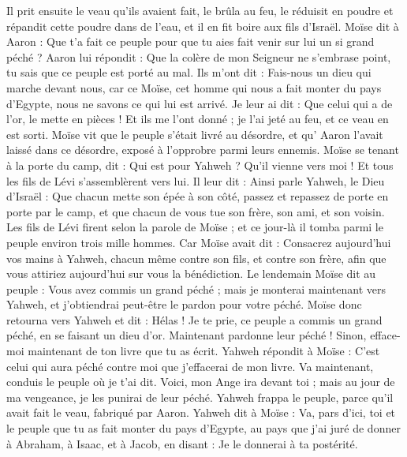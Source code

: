 \begin{multicols}{2}
Il prit ensuite le veau qu'ils avaient fait, le brûla au feu, le réduisit en poudre et répandit cette poudre dans de l'eau, et il en fit boire aux fils d'Israël.
Moïse dit à Aaron : Que t'a fait ce peuple pour que tu aies fait venir sur lui un si grand péché ?
Aaron lui répondit : Que la colère de mon Seigneur ne s'embrase point, tu sais que ce peuple est porté au mal.
Ils m'ont dit : Fais-nous un dieu qui marche devant nous, car ce Moïse, cet homme qui nous a fait monter du pays d'Egypte, nous ne savons ce qui lui est arrivé.
Je leur ai dit : Que celui qui a de l'or, le mette en pièces ! Et ils me l'ont donné ; je l'ai jeté au feu, et ce veau en est sorti.
Moïse vit que le peuple s’était livré au désordre, et qu’ Aaron l'avait laissé dans ce désordre, exposé à l’opprobre parmi leurs ennemis.
Moïse se tenant à la porte du camp, dit : Qui est pour Yahweh ? Qu'il vienne vers moi ! Et tous les fils de Lévi s'assemblèrent vers lui.
Il leur dit : Ainsi parle Yahweh, le Dieu d'Israël : Que chacun mette son épée à son côté, passez et repassez de porte en porte par le camp, et que chacun de vous tue son frère, son ami, et son voisin.
Les fils de Lévi firent selon la parole de Moïse ; et ce jour-là il tomba parmi le peuple environ trois mille hommes.
Car Moïse avait dit : Consacrez aujourd'hui vos mains à Yahweh, chacun même contre son fils, et contre son frère, afin que vous attiriez aujourd'hui sur vous la bénédiction.
Le lendemain Moïse dit au peuple : Vous avez commis un grand péché ; mais je monterai maintenant vers Yahweh, et j’obtiendrai peut-être le pardon pour votre péché.
Moïse donc retourna vers Yahweh et dit : Hélas ! Je te prie, ce peuple a commis un grand péché, en se faisant un dieu d'or.
Maintenant pardonne leur péché ! Sinon, efface-moi maintenant de ton livre que tu as écrit.
Yahweh répondit à Moïse : C’est celui qui aura péché contre moi que j’effacerai de mon livre.
Va maintenant, conduis le peuple où je t’ai dit. Voici, mon Ange ira devant toi ; mais au jour de ma vengeance, je les punirai de leur péché.
Yahweh frappa le peuple, parce qu'il avait fait le veau, fabriqué par Aaron.
\VerseOne{}Yahweh dit à Moïse : Va, pars d'ici, toi et le peuple que tu as fait monter du pays d'Egypte, au pays que j'ai juré de donner à Abraham, à Isaac, et à Jacob, en disant : Je le donnerai à ta postérité.

\end{multicols}
